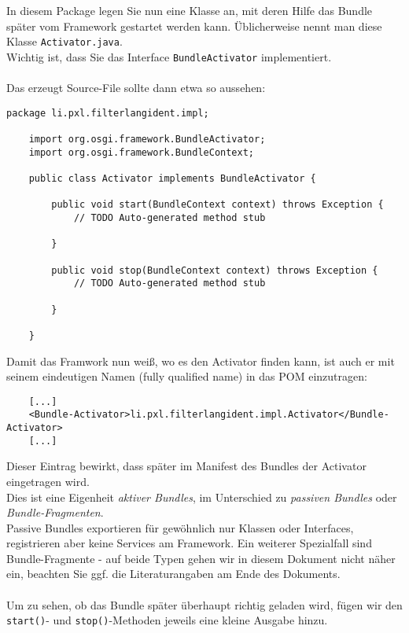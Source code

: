 \documentclass[a4paper,12pt]{scrartcl}
\begin{document}
In diesem Package legen Sie nun eine Klasse an, mit deren Hilfe das Bundle später vom Framework gestartet werden kann. Üblicherweise nennt man diese Klasse \lstinline[breaklines=false, basicstyle=\itshape]|Activator.java|.\\
Wichtig ist, dass Sie das Interface \lstinline[breaklines=false, basicstyle=\itshape]|BundleActivator| implementiert.\\
\\
Das erzeugt Source-File sollte dann etwa so aussehen:
\begin{lstlisting}[caption=Einfacher Activator für unser FilterLangIdent-Beispielbundle]
	package li.pxl.filterlangident.impl;
	
	import org.osgi.framework.BundleActivator;
	import org.osgi.framework.BundleContext;
	
	public class Activator implements BundleActivator {
	
		public void start(BundleContext context) throws Exception {
			// TODO Auto-generated method stub
			
		}
	
		public void stop(BundleContext context) throws Exception {
			// TODO Auto-generated method stub
			
		}
	
	}
\end{lstlisting}
Damit das Framwork nun weiß, wo es den Activator finden kann, ist auch er mit seinem eindeutigen Namen (fully qualified name) in das POM einzutragen:
\begin{lstlisting}
	[...]
	<Bundle-Activator>li.pxl.filterlangident.impl.Activator</Bundle-Activator>
	[...]
\end{lstlisting}
Dieser Eintrag bewirkt, dass später im Manifest des Bundles der Activator eingetragen wird.\\
Dies ist eine Eigenheit \emph{aktiver Bundles}, im Unterschied zu \emph{passiven Bundles} oder \emph{Bundle-Fragmenten}.\\
Passive Bundles exportieren für gewöhnlich nur Klassen oder Interfaces, registrieren aber keine Services am Framework. Ein weiterer Spezialfall sind Bundle-Fragmente - auf beide Typen gehen wir in diesem Dokument nicht näher ein, beachten Sie ggf. die Literaturangaben am Ende des Dokuments.\\
\\
Um zu sehen, ob das Bundle später überhaupt richtig geladen wird, fügen wir den \lstinline[breaklines=false, basicstyle=\itshape]|start()|- und \lstinline[breaklines=false, basicstyle=\itshape]|stop()|-Methoden jeweils eine kleine Ausgabe hinzu.
\end{document}
